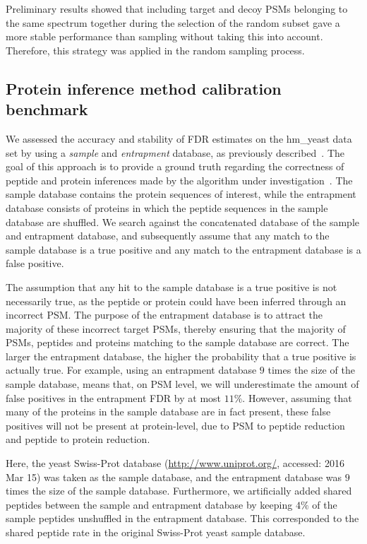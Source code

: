 \documentclass{article}
\begin{document}
Preliminary results showed that including target and decoy PSMs 
belonging to the same spectrum together during the selection of the 
random subset gave a more stable performance than sampling without 
taking this into account. Therefore, this strategy was applied in the 
random sampling process.

\subsection*{Protein inference method calibration benchmark}

We assessed the accuracy and stability of FDR estimates on the 
hm\_yeast data set by using a {\em sample} and {\em entrapment} 
database, as previously described~\cite{granholm2013determining}. The 
goal of this approach is to provide a ground truth regarding the 
correctness of peptide and protein inferences made by the algorithm 
under investigation~\cite{the:how}. The sample database contains the 
protein sequences of interest, while the entrapment database consists 
of proteins in which the peptide sequences in the sample database are 
shuffled. We search against the concatenated database of the sample 
and entrapment database, and subsequently assume that any match to the 
sample database is a true positive and any match to the entrapment 
database is a false positive. 

The assumption that any hit to the sample database is a true positive 
is not necessarily true, as the peptide or protein could have been 
inferred through an incorrect PSM. The purpose of the entrapment 
database is to attract the majority of these incorrect target PSMs, 
thereby ensuring that the majority of PSMs, peptides and proteins 
matching to the sample database are correct. The larger the entrapment 
database, the higher the probability that a true positive is 
actually true. For example, using an entrapment database $9$ times the 
size of the sample database, means that, on PSM level, we will 
underestimate the amount of false positives in the entrapment FDR by 
at most $11\%$. However, assuming that many of the proteins in the 
sample database are in fact present, these false positives will not 
be present at protein-level, due to PSM to peptide reduction and 
peptide to protein reduction.

Here, the yeast Swiss-Prot database (\url{http://www.uniprot.org/}, 
accessed: 2016 Mar 15) was taken as the sample database, and the 
entrapment database was $9$ times the size of the sample database. 
Furthermore, we artificially added shared peptides between the sample 
and entrapment database by keeping $4\%$ of the sample peptides 
unshuffled in the entrapment database. This corresponded to the 
shared peptide rate in the original Swiss-Prot yeast sample database.
\end{document}
